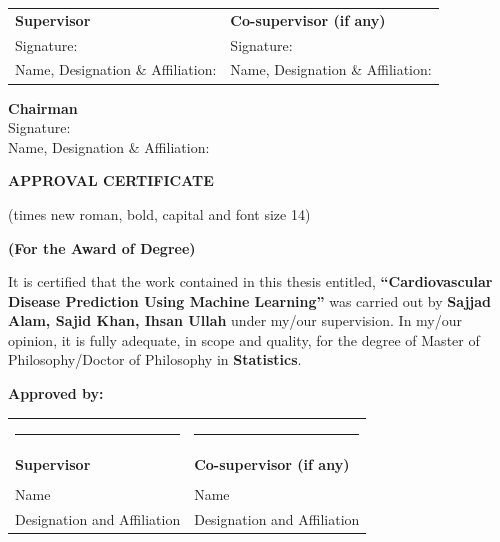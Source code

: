 \documentclass[12pt, a4paper, oneside]{book}
\newcommand{\thesistitle}{Cardiovascular Disease Prediction Using Machine Learning}
\newcommand{\thesisauthorA}{Sajjad Alam}
\newcommand{\thesisauthorB}{Sajid Khan}
\newcommand{\thesisauthorC}{Ihsan Ullah}
\begin{document}
\vspace{0.8in}

\noindent
\begin{tabular}{@{}p{}p{}@{}}
\textbf{Supervisor} & \textbf{Co-supervisor (if any)} \\
Signature: \hrulefill & Signature: \hrulefill \\
Name, Designation \& Affiliation: \hrulefill & Name, Designation \& Affiliation: \hrulefill
\end{tabular}

\vspace{0.6in}
\noindent \textbf{Chairman}\\
Signature: \hrulefill\\
Name, Designation \& Affiliation: \hrulefill

\clearpage
\thispagestyle{plain}
\vspace*{0.5cm}
\begin{center}
{\fontsize{14pt}{16pt}\selectfont \textbf{APPROVAL CERTIFICATE}\par}
\vspace{0.05in}
{\fontsize{11pt}{13pt}\selectfont (times new roman, bold, capital and font size 14)\par}
\vspace{0.2in}
{\fontsize{14pt}{16pt}\selectfont \textbf{(For the Award of Degree)}\par}
\end{center}
\vspace{0.4in}

\noindent It is certified that the work contained in this thesis entitled, \textbf{``\thesistitle''} was carried out by \textbf{\thesisauthorA, \thesisauthorB, \thesisauthorC} under my/our supervision. In my/our opinion, it is fully adequate, in scope and quality, for the degree of Master of Philosophy/Doctor of Philosophy in \textbf{Statistics}.

\vspace{0.6in}

\noindent \textbf{Approved by:}

\vspace{0.5in}

\noindent
\begin{tabular}{@{}p{}p{}@{}}
\rule{2.2in}{0.4pt} & \rule{2.2in}{0.4pt} \\
\textbf{Supervisor} & \textbf{Co-supervisor (if any)} \\
& \\
Name & Name \\
Designation and Affiliation & Designation and Affiliation
\end{tabular}
\end{document}
